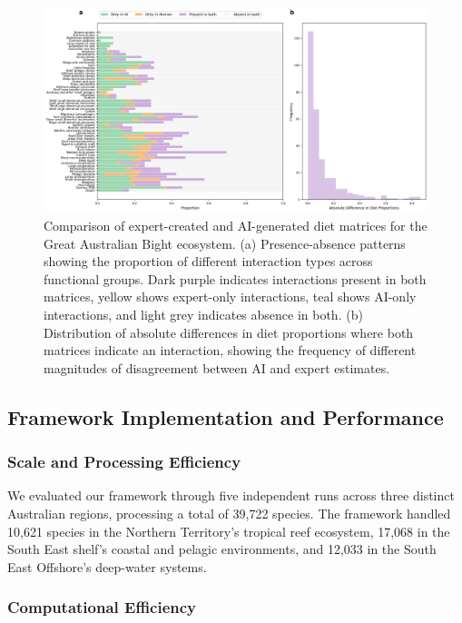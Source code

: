 \begin{landscape}
\begin{figure}[htbp]
    \centering
    \includegraphics[width=1.2\paperwidth]{figures/diet_matrix_validation/simplified_comparison.png}
    \caption{Comparison of expert-created and AI-generated diet matrices for the Great Australian Bight ecosystem. (a) Presence-absence patterns showing the proportion of different interaction types across functional groups. Dark purple indicates interactions present in both matrices, yellow shows expert-only interactions, teal shows AI-only interactions, and light grey indicates absence in both. (b) Distribution of absolute differences in diet proportions where both matrices indicate an interaction, showing the frequency of different magnitudes of disagreement between AI and expert estimates.}
    \label{fig:gab_comparison}
\end{figure}
\end{landscape}

\subsection{Framework Implementation and Performance}

\subsubsection{Scale and Processing Efficiency}
We evaluated our framework through five independent runs across three distinct Australian regions, processing a total of 39,722 species. The framework handled 10,621 species in the Northern Territory's tropical reef ecosystem, 17,068 in the South East shelf's coastal and pelagic environments, and 12,033 in the South East Offshore's deep-water systems. 

\subsubsection{Computational Efficiency}



